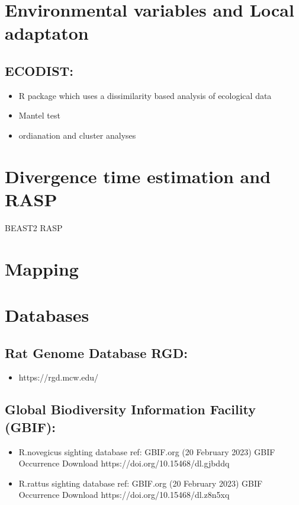 \documentclass[document.tex]{subfiles}
\begin{document}
\section*{Environmental variables and Local adaptaton}

    \subsection{ECODIST: }
        \begin{itemize}
        \item R package which uses a dissimilarity based analysis of ecological data 
        \item Mantel test
        \item ordianation and cluster analyses
        \end{itemize} 


\section*{Divergence time estimation and RASP}

BEAST2
RASP


\section*{Mapping}


\section*{Databases}

    \subsection{Rat Genome Database RGD: }
    \begin{itemize}
    \item https://rgd.mcw.edu/
    \end{itemize} 

    \subsection{Global Biodiversity Information Facility (GBIF): }
    \begin{itemize}
    \item R.novegicus sighting database ref: GBIF.org (20 February 2023) GBIF Occurrence Download  https://doi.org/10.15468/dl.gjbddq
    \item R.rattus sighting database ref: GBIF.org (20 February 2023) GBIF Occurrence Download https://doi.org/10.15468/dl.z8n5xq
    \end{itemize} 

    

\bib{}
    
\end{document}
